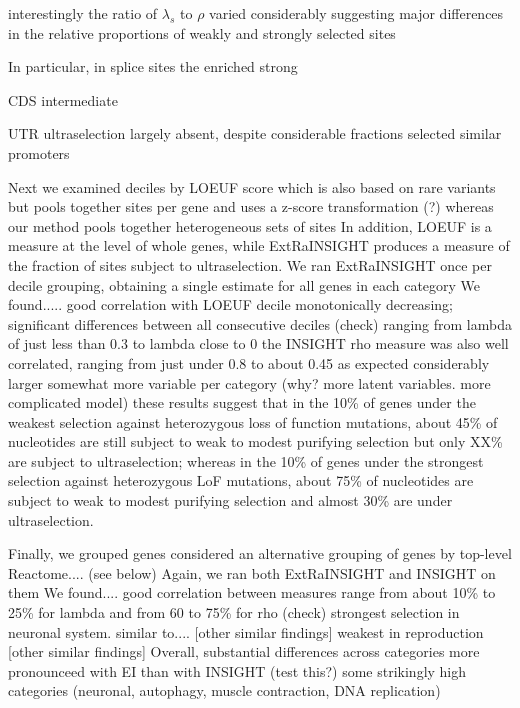 \documentclass[11pt]{article}
\begin{document}

interestingly the ratio of $\lambda_s$ to $\rho$ varied considerably
suggesting major differences in the relative proportions of weakly and strongly selected sites

In particular,
in splice sites the
enriched strong

CDS intermediate

UTR ultraselection largely absent, despite considerable fractions selected
similar promoters





Next we examined
deciles by LOEUF score
which is also based on rare variants but pools together sites per gene
and uses a z-score transformation (?)
whereas our method pools together heterogeneous sets of sites
In addition, LOEUF is a measure at the level of whole genes, while ExtRaINSIGHT produces a measure of the fraction of sites subject to ultraselection.
We ran ExtRaINSIGHT once per decile grouping, obtaining a single estimate for all genes in each category
We found.....
good correlation with LOEUF decile
monotonically decreasing; significant differences between all consecutive deciles (check)
ranging from lambda of just less than 0.3 to lambda close to 0
the INSIGHT rho measure was also well correlated, ranging from just under 0.8 to about 0.45
as expected considerably larger
somewhat more variable per category (why?  more latent variables.  more complicated model)
these results suggest that in the 10\% of genes under the weakest selection against heterozygous loss of function mutations,
about 45\% of nucleotides are still subject to weak to modest purifying selection but only XX\% are subject to ultraselection;
whereas in the 10\% of genes under the strongest selection against heterozygous LoF mutations, about 75\% of nucleotides are subject to weak to modest purifying selection and almost 30\% are under ultraselection.  


Finally, we grouped genes
considered an alternative grouping of genes by top-level Reactome.... (see below)
Again, we ran both ExtRaINSIGHT and INSIGHT on them
We found....
good correlation between measures
range from about 10\% to 25\% for lambda
and from 60 to 75\% for rho (check)
strongest selection in neuronal system.  similar to.... [other similar findings]
weakest in reproduction [other similar findings]
Overall, substantial differences across categories
more pronounceed with EI than with INSIGHT (test this?)
some strikingly high categories (neuronal, autophagy, muscle contraction, DNA replication)
\end{document}
